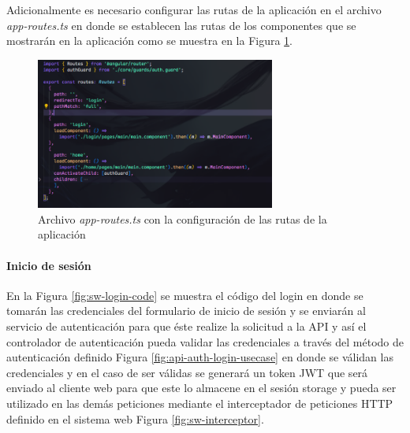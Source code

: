 Adicionalmente es necesario configurar las rutas de la aplicación en el archivo \textit{app-routes.ts} en donde se establecen las rutas de los componentes que se mostrarán en la aplicación como se muestra en la Figura \ref{fig:app-routing}.

\begin{figure}[H]
    \centering
    \includegraphics[width=0.7\textwidth]{resources/images/app-routes}
    \caption{Archivo \textit{app-routes.ts} con la configuración de las rutas de la aplicación}
    \label{fig:app-routing}
\end{figure}

\paragraph{Inicio de sesión}

En la Figura \ref{fig:sw-login-code} se muestra el código del login en donde se tomarán las credenciales del formulario de inicio de sesión y se enviarán al servicio de autenticación para que éste realize la solicitud a la API y así el controlador de autenticación pueda validar las credenciales a través del método de autenticación definido Figura \ref{fig:api-auth-login-usecase} en donde se válidan las credenciales y en el caso de ser válidas se generará un token JWT que será enviado al cliente web para que este lo almacene en el sesión storage y pueda ser utilizado en las demás peticiones mediante el interceptador de peticiones HTTP definido en el sistema web Figura \ref{fig:sw-interceptor}.


